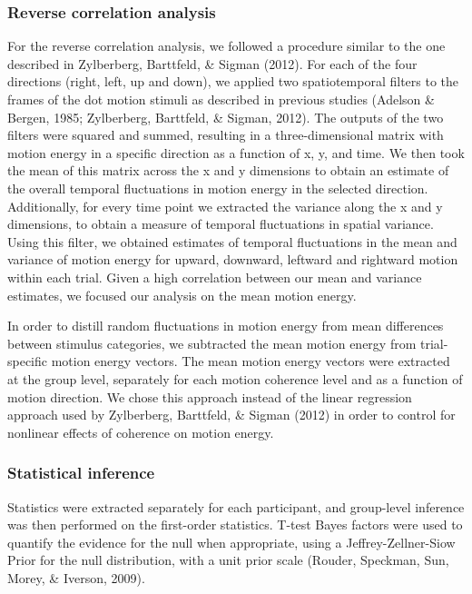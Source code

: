 \documentclass[12pt,twoside]{reedthesis}
\begin{document}
\hypertarget{reverse-correlation-analysis}{%
\subsubsection*{Reverse correlation analysis}\label{reverse-correlation-analysis}}

For the reverse correlation analysis, we followed a procedure similar to the one described in Zylberberg, Barttfeld, \& Sigman (2012). For each of the four directions (right, left, up and down), we applied two spatiotemporal filters to the frames of the dot motion stimuli as described in previous studies (Adelson \& Bergen, 1985; Zylberberg, Barttfeld, \& Sigman, 2012). The outputs of the two filters were squared and summed, resulting in a three-dimensional matrix with motion energy in a specific direction as a function of x, y, and time. We then took the mean of this matrix across the x and y dimensions to obtain an estimate of the overall temporal fluctuations in motion energy in the selected direction. Additionally, for every time point we extracted the variance along the x and y dimensions, to obtain a measure of temporal fluctuations in spatial variance. Using this filter, we obtained estimates of temporal fluctuations in the mean and variance of motion energy for upward, downward, leftward and rightward motion within each trial. Given a high correlation between our mean and variance estimates, we focused our analysis on the mean motion energy.

In order to distill random fluctuations in motion energy from mean differences between stimulus categories, we subtracted the mean motion energy from trial-specific motion energy vectors. The mean motion energy vectors were extracted at the group level, separately for each motion coherence level and as a function of motion direction. We chose this approach instead of the linear regression approach used by Zylberberg, Barttfeld, \& Sigman (2012) in order to control for nonlinear effects of coherence on motion energy.

\hypertarget{statistical-inference}{%
\subsubsection*{Statistical inference}\label{statistical-inference}}

Statistics were extracted separately for each participant, and group-level inference was then performed on the first-order statistics. T-test Bayes factors were used to quantify the evidence for the null when appropriate, using a Jeffrey-Zellner-Siow Prior for the null distribution, with a unit prior scale (Rouder, Speckman, Sun, Morey, \& Iverson, 2009).
\end{document}
